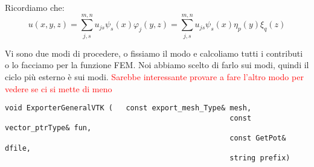 Ricordiamo che:
\begin{equation}
u(x,y,z) = \sum_{j,s}^{m,n}u_{js}\psi_s(x)\varphi_j(y,z) = \sum_{j,s}^{m,n}u_{js}\psi_s(x)\eta_p(y)\xi_q(z)
\end{equation}

Vi sono due modi di procedere, o fissiamo il modo e calcoliamo tutti i contributi o lo facciamo per la funzione FEM.
Noi abbiamo scelto di farlo sui modi, quindi il ciclo pi\`u esterno \`e sui modi.
\textcolor{red}{Sarebbe interessante provare a fare l'altro modo per vedere se ci si mette di meno}

\begin{lstlisting}[style = general]
void ExporterGeneralVTK (	const export_mesh_Type& mesh,
													const vector_ptrType& fun,
													const GetPot& dfile,
													string prefix)
\end{lstlisting}